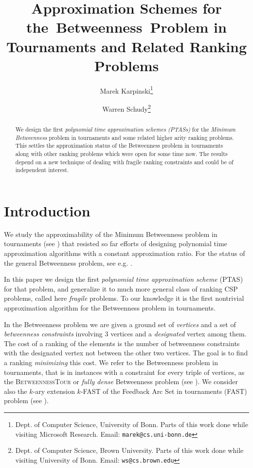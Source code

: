 \documentclass[dvips,11pt,letter]{article}
\newcommand{\betTour}{\textsc{BetweennessTour}}
\newcommand{\fast}{\textsc{FAST}}
\begin{document}
\title{\huge
  \textbf{
    Approximation Schemes for the~Betweenness~Problem in Tournaments   
    and Related Ranking Problems\\[2ex]}}
\author{
  Marek Karpinski\thanks{
    Dept. of Computer Science, University of Bonn.
    Parts of this work done while visiting Microsoft Research.
    Email: {\tt marek@cs.uni-bonn.de}}
  \and
  Warren Schudy\thanks{
    Dept. of Computer Science, Brown University.
    Parts of this work done while visiting University of Bonn.
    Email: {\tt ws@cs.brown.edu}}\\[2ex]}
\date{}
\maketitle

\begin{abstract}
{\normalsize
We design the first \emph{polynomial time approximation schemes (PTASs)} for the
\emph{Minimum Betweenness} problem in tournaments and some related higher arity
ranking problems. This settles the approximation status of the Betweenness problem
in tournaments along with other ranking problems which were open for some time now. The results depend on a new technique of dealing with fragile ranking constraints and could be of independent interest.
}
\end{abstract}



\section{Introduction}

We study the approximability of the Minimum Betweenness problem in tournaments
(see \cite{AA07}) that resisted so far efforts of designing polynomial time approximation algorithms with a constant approximation ratio.
For the status of the general Betweenness problem, see e.g. \cite{O79,CS98,AA07,CGM09}.

In this paper we design the first \emph{polynomial time approximation scheme} (PTAS) for that problem, and generalize it to much more general class of ranking CSP problems, called here \emph{fragile} problems.
To our knowledge it is the first nontrivial approximation algorithm for the Betweenness problem in tournaments.

In the Betweenness problem we are given a ground set of \emph{vertices} and a set of \emph{betweenness constraints} involving $3$ vertices and a \emph{designated} vertex among them.
The cost of a ranking of the elements is the number of betweenness constraints with the designated vertex not between the other two vertices.
The goal is to find a ranking \emph{minimizing} this cost.
We refer to the Betweenness problem in tournaments, that is in instances with a constraint for every triple of vertices, as the \betTour{} or \emph{fully dense} Betweenness problem (see \cite{AA07}).
We consider also the $k$-ary extension $k$-\fast{} of the Feedback Arc Set in tournaments (\fast) problem (see \cite{mathieu09fast,A07,ACN08}).
\end{document}
